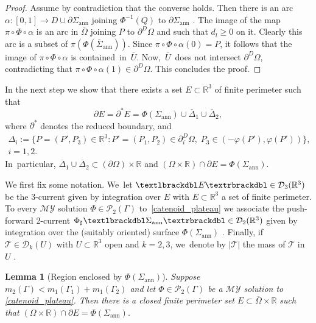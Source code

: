 \documentclass[11pt]{article}
\numberwithin{equation}{section}
\newcommand{\R}{\mathbb{R}}
\let\Om\Omega
\newcommand{\jump}[1]{\textup{\textlbrackdbl}{#1}\textup{\textrbrackdbl}}
\newcommand{\openannulus}{\Sigma_\mathrm{ann}}
\newcommand{\immclosedann}{\Phi({\overline\Sigma}_\mathrm{ann})}
\newtheorem{lemma}[theorem]{Lemma}
\theoremstyle{definition}
\begin{document}
\begin{proof}
Assume by contradiction that the converse holds. Then there is an arc $\alpha:[0,1]\to D\cup\partial\openannulus$ joining $\Phi^{-1}(Q)$ to $\partial\openannulus$ .
The image of the
map $\pi\circ\Phi\circ \alpha$ is an arc in $\overline \Omega$
joining $P$ to $\partial^D\Om$ and such that $d_l\geq0$ on it.
Clearly this arc is a subset of $\pi(\immclosedann)$. Since $\pi\circ\Phi\circ \alpha(0)=P$, it follows that the image of $\pi\circ\Phi\circ \alpha$ is contained~in~$\overline U$. Now,~$\overline U$~does not intersect $\partial^D\Om$, contradicting that $\pi\circ\Phi\circ \alpha(1)\in \partial^D\Om$. This concludes the proof.
\end{proof}

In the next step we show
that there exists a set $E\subset\R^3$ of finite perimeter such that
\[
\partial E=\partial^*E=\Phi(\openannulus)\cup\overline\Delta_1\cup\overline\Delta_2,
\]
where $\partial^*$ denotes the reduced boundary, and
\begin{multline}\label{delta}
\Delta_i:=\{P=(P',P_3)\in \R^3:P'=(P_1,P_2)\in \partial_i^D\Om, \;P_3\in (-\varphi(P'),\varphi(P'))\},
\\
i=1,2.
\end{multline}
In~particular, $\overline\Delta_1\cup\overline\Delta_2\subset(\partial\Om)\times\R$ and
$(\Om\times\R)\cap\partial E=\Phi(\openannulus)$.

We first fix some notation. We~let $\jump{E}\in\mathcal{D}_3(\R^3)$ be the 3-current given by integration over $E$ with $E\subset\R^3$ a set of finite perimeter.
To every $\mathcal{MY}$ solution
$\Phi\in\mathcal{P}_2(\Gamma)$
to~\eqref{catenoid_plateau} we associate the push-forward 2-current $\Phi_\sharp\jump{\openannulus}\in\mathcal D_2(\R^3)$ given by integration over the (suitably oriented) surface $\Phi(\openannulus)$
\cite[\S 7.4.2]{Krantz-Parks}.
Finally, if $\mathcal{T}\in\mathcal{D}_k(U)$ with $U\subset\R^3$ open and $k=2,3$, we~denote by $|\mathcal{T}|$ the mass of $\mathcal{T}$ in $U$
\cite[p.\,358]{Federer}.

\begin{lemma}[Region enclosed by $\Phi(\openannulus)$]
\label{lem:region_enclosed_by_Phi(Sigma_min)}
Suppose $m_2(\Gamma)<m_1(\Gamma_1)+m_1(\Gamma_2)$ and let $\Phi\in\mathcal{P}_2(\Gamma)$ be a $\mathcal{MY}$ solution to \eqref{catenoid_plateau}.
Then there is a closed
finite perimeter set $E\subset\overline\Om\times\R$ such that $(\Om\times\R)\cap\partial E=\Phi(\openannulus)$.
\end{lemma}
\end{document}
